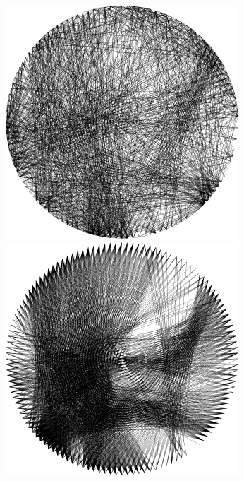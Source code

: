 \begin{figure}[H]
    \centering
    \begin{minipage}{0.2\linewidth}
        \centering
        \includegraphics[width=\linewidth]{images/mp_binary/greedy_random_binary.png}
    \end{minipage}
    \begin{minipage}{0.2\linewidth}
        \centering
        \includegraphics[width=\linewidth]{images/mp_binary/greedy_dot-product_binary.png}

\end{minipage}
\end{figure}
